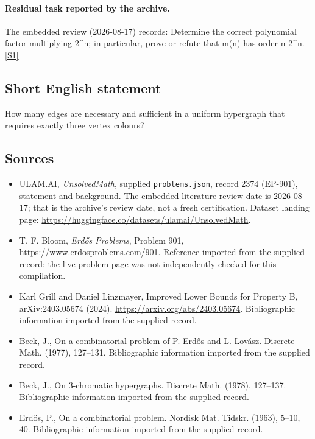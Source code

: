 \documentclass[11pt,a4paper]{article}
\newcommand{\sref}[2]{\hyperlink{source:#1:#2}{[S#2]}}
\begin{document}
\paragraph{Residual task reported by the archive.}

The embedded review (2026-08-17) records: Determine the correct polynomial factor multiplying 2\textasciicircum{}n; in particular, prove or refute that m(n) has order n 2\textasciicircum{}n. \sref{2374}{1}

\subsection{Short English statement}

How many edges are necessary and sufficient in a uniform hypergraph that requires exactly three vertex colours?

\subsection{Sources}

{\small

\begin{itemize}

\item[\hypertarget{source:2374:1}{S1}] ULAM.AI, \emph{UnsolvedMath}, supplied \texttt{problems.json}, record 2374 (EP-901), statement and background. The embedded literature-review date is 2026-08-17; that is the archive’s review date, not a fresh certification. Dataset landing page: \url{https://huggingface.co/datasets/ulamai/UnsolvedMath}.

\item[\hypertarget{source:2374:2}{S2}] T. F. Bloom, \emph{Erdős Problems}, Problem 901, \url{https://www.erdosproblems.com/901}. Reference imported from the supplied record; the live problem page was not independently checked for this compilation.

\item[\hypertarget{source:2374:3}{S3}] Karl Grill and Daniel Linzmayer, Improved Lower Bounds for Property B, arXiv:2403.05674 (2024). \url{https://arxiv.org/abs/2403.05674}. Bibliographic information imported from the supplied record.

\item[\hypertarget{source:2374:4}{S4}] Beck, J., On a combinatorial problem of {P}. {E}rd\H{o}s and {L}. {L}ov\'asz. Discrete Math. (1977), 127--131. Bibliographic information imported from the supplied record.

\item[\hypertarget{source:2374:5}{S5}] Beck, J., On {$3$}-chromatic hypergraphs. Discrete Math. (1978), 127--137. Bibliographic information imported from the supplied record.

\item[\hypertarget{source:2374:6}{S6}] Erd\H{o}s, P., On a combinatorial problem. Nordisk Mat. Tidskr. (1963), 5--10, 40. Bibliographic information imported from the supplied record.

\end{itemize}

}

\label{end:2374}
\end{document}
